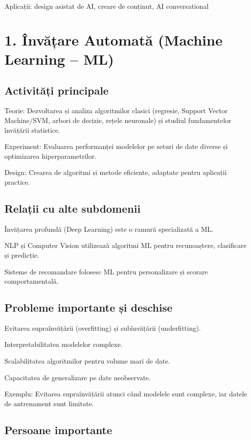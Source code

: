 \documentclass[12pt]{article}
\begin{document}
Aplicații: design asistat de AI, creare de conținut, AI conversational

\section{1. Învățare Automată (Machine Learning – ML)}

\subsection*{Activități principale}

Teorie: Dezvoltarea și analiza algoritmilor clasici (regresie, Support Vector Machine/SVM, arbori de decizie, rețele neuronale) și studiul fundamentelor învățării statistice.

Experiment: Evaluarea performanței modelelor pe seturi de date diverse și optimizarea hiperparametrilor.

Design: Crearea de algoritmi și metode eficiente, adaptate pentru aplicații practice.

\subsection*{Relații cu alte subdomenii}

Învățarea profundă (Deep Learning) este o ramură specializată a ML.

NLP și Computer Vision utilizează algoritmi ML pentru recunoaștere, clasificare și predicție.

Sisteme de recomandare folosesc ML pentru personalizare și scorare comportamentală.

\subsection*{Probleme importante și deschise}

Evitarea supraînvățării (overfitting) și subînvățării (underfitting).

Interpretabilitatea modelelor complexe.

Scalabilitatea algoritmilor pentru volume mari de date.

Capacitatea de generalizare pe date neobservate.

Exemplu: Evitarea supraînvățării atunci când modelele sunt complexe, iar datele de antrenament sunt limitate.

\subsection*{Persoane importante}
\end{document}
